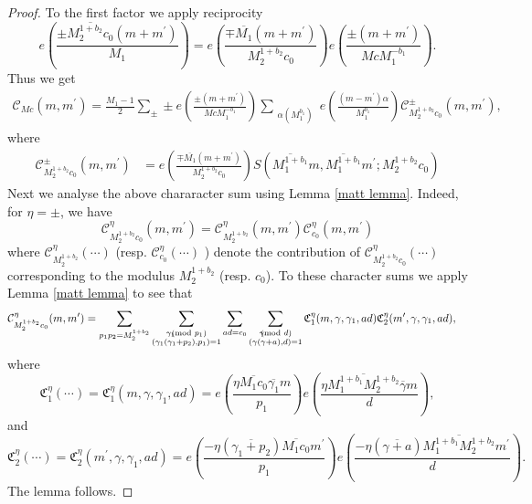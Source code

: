 \documentclass[12pt,a4paper,twoside, reqno]{amsart}
\newcommand{\shortmod}{\ensuremath{\negthickspace \negthickspace \negthickspace \pmod}}
\newcommand{\e}[2]{e\left(\frac{#1}{#2}\right)}
\begin{document}
\begin{proof}
To the first factor we apply reciprocity 
\[ e\left(\frac{\pm\overline{M_2^{1+b_2}c_0}(m+m^\prime)}{M_1} \right)= e\left(\frac{\mp\overline{M_1}(m+m^\prime)}{M_2^{1+b_2}c_0} \right) e\left(\frac{\pm(m+m^\prime)}{McM_1^{-b_1} } \right).\]
Thus we get 
\begin{align}
        \mathcal{C}_{Mc}(m,m^\prime)= \frac{M_1-1}{2} \sum_{\pm}\pm e\left(\frac{\pm(m+m^\prime)}{Mc M_1^{-b_1}}   \right) \mathop{\sum}_{\substack{\alpha (M_1^{b_1})  }} e\left(\frac{  (  m- m^\prime) \alpha}{M_1^{b_1}} \right) \mathcal{C}_{M_2^{1+b_2}c_0}^{\pm}(m, m^\prime),
    \end{align}
    where 
    \begin{align*}
    \mathcal{C}_{M_2^{1+b_2}c_0}^{\pm }(m, m^\prime) &=  e\left(\frac{\mp\overline{M_1}(m+m^\prime)}{M_2^{1+b_2}c_0} \right)  S(\overline{M_1^{1+b_1}} m, \overline{M_1^{1+b_1}}m^\prime;M_2^{1+b_2}c_0)  
\end{align*}
Next we analyse the above chararacter sum using Lemma  \ref{matt lemma}. Indeed, for $\eta=\pm$, we have
\[  \mathcal{C}_{M_2^{1+b_2}c_0}^{\eta}(m, m^\prime) = \mathcal{C}_{ M_2^{1+b_2}}^{\eta}( m, m^\prime)\mathcal{C}_{c_0}^{\eta}(  m,  m^\prime)  \]
where $  \mathcal{C}_{ M_2^{1+b_2} }^{\eta}( \cdots)$ (resp. $\mathcal{C}_{c_0 }^{\eta}( \cdots)$ ) denote the contribution of $ \mathcal{C}_{ M_2^{1+b_2} c_0 }^{\eta}( \cdots)$ corresponding to the modulus   $M_2^{1+b_2}$ (resp. $c_0$). To these character sums we apply Lemma  \ref{matt lemma} to see that 
\begin{align*}
    \mathcal{C}_{M_2^{1+b_2}c_0}^{\eta}(m, m^\prime) 
    &=  \sum_{p_1p_2=M_2^{1+b_2}} \sum_{\substack{\gamma_1 \shortmod{p_1} \\ (\gamma_1(\gamma_1+p_2),p_1)=1}} \sum_{ad=c_0}\sum_{\substack{\gamma \shortmod{d} \\ (\gamma(\gamma+a),d)=1}}  \mathfrak{C}_1^{\eta}(m, \gamma,\gamma_1, ad) \mathfrak{C}_2^{\eta}(m^\prime, \gamma, \gamma_1, ad),
\end{align*}
where 
\[ \mathfrak{C}_1^{\eta}(\cdots)=\mathfrak{C}_1^{\eta}(m, \gamma,\gamma_1, ad)=  \e{\eta \overline{M_1c_0} \overline{\gamma_1} m} {p_1}  \e{\eta \overline{M_1^{1+b_1}M_2^{1+b_2} } \overline{\gamma} m }{d},\]
and 
\[ \mathfrak{C}_2^{\eta}(\cdots)=  \mathfrak{C}_2^{\eta}(m^\prime, \gamma, \gamma_1, ad)= \e{- \eta (\overline{\gamma_1+p_2})  \overline{M_1c_0} m^\prime}{p_1}  \e{ - \eta (\overline{\gamma+a})  \overline{M_1^{1+b_1} M_2^{1+b_2}} m^\prime}{d}.\]
 The lemma follows.
\end{proof}
\end{document}
